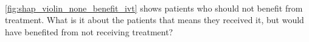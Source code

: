 \begin{figure}
\\
\caption{}
\label{fig:shap_violin_all_benefit_ivt}
\end{figure}

\ref{fig:shap_violin_none_benefit_ivt} shows patients who should not benefit from treatment. What is it about the patients that means they received it, but would have benefited from not receiving treatment?

